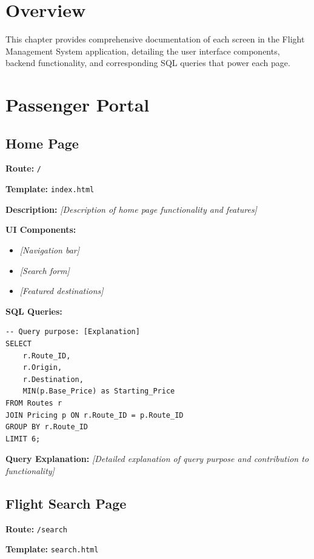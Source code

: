 \documentclass[12pt,a4paper,openany]{report}
\begin{document}
\section{Overview}

This chapter provides comprehensive documentation of each screen in the Flight Management System application, detailing the user interface components, backend functionality, and corresponding SQL queries that power each page.

\section{Passenger Portal}

\subsection{Home Page}

\textbf{Route:} \texttt{/}

\textbf{Template:} \texttt{index.html}

\textbf{Description:}
\textit{[Description of home page functionality and features]}

\textbf{UI Components:}
\begin{itemize}
    \item \textit{[Navigation bar]}
    \item \textit{[Search form]}
    \item \textit{[Featured destinations]}
\end{itemize}

\textbf{SQL Queries:}

\begin{lstlisting}[caption={Home Page - Featured Routes Query}]
-- Query purpose: [Explanation]
SELECT 
    r.Route_ID,
    r.Origin,
    r.Destination,
    MIN(p.Base_Price) as Starting_Price
FROM Routes r
JOIN Pricing p ON r.Route_ID = p.Route_ID
GROUP BY r.Route_ID
LIMIT 6;
\end{lstlisting}

\textbf{Query Explanation:}
\textit{[Detailed explanation of query purpose and contribution to functionality]}

\subsection{Flight Search Page}

\textbf{Route:} \texttt{/search}

\textbf{Template:} \texttt{search.html}
\end{document}
